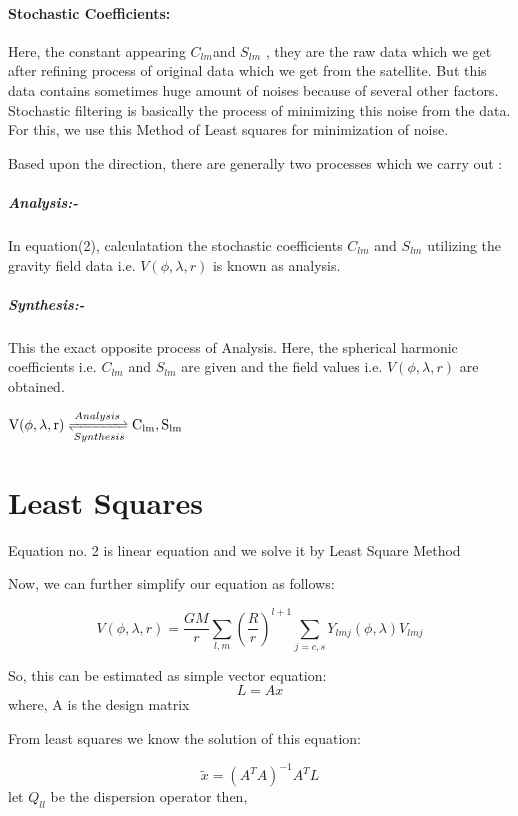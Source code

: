 \documentclass[a4paper,12pt]{article}
\begin{document}
\paragraph{Stochastic Coefficients:} 
Here, the constant appearing $C_{lm}$and $S_{lm}$ , they are the raw data which we get after refining process of original data which we get from the satellite. But this data contains sometimes huge amount of noises because of several other factors. Stochastic filtering is basically the process of minimizing this noise from the data. For this, we use this Method of Least squares for minimization of noise.

Based upon the direction, there are generally two processes which we carry out :

\subparagraph{Analysis:- }  In equation(2), calculatation the stochastic coefficients $C_{lm} $ and $S_{lm}$ utilizing the gravity field data i.e. $V(\phi,\lambda,r)$ is known as analysis.
 \subparagraph{Synthesis:- } This the exact opposite process of Analysis. Here, the spherical harmonic coefficients i.e.  $C_{lm} $ and $S_{lm}$ are given and the field values i.e. $V(\phi,\lambda,r)$ are obtained. \\

\centerline{
$\mathrm{V(\phi,\lambda,r)} \xrightleftharpoons[Synthesis]{Analysis} \mathrm{C_{lm}, S_{lm}}$
}

\section{Least Squares}
Equation no. 2 is linear equation and we solve it by Least Square Method

Now, we can further simplify our equation as follows:

\begin{equation}
V(\phi,\lambda,r)=\frac{GM}{r}\sum_{l,m}^{} \left(\frac{R}{r}\right)^{l+1}\sum_{j=c,s}^{}  Y_{lmj} (\phi,\lambda) V_{lmj}
\end{equation}

So, this can be estimated as simple vector equation:
\begin{equation}
  L= Ax  
\end{equation}
where, A is the design matrix

From least squares we know the solution of this equation:

\begin{equation}
\tilde{x} =(A^T A)^{-1} A^T L
\end{equation}
let $ Q_{ll}$ be the dispersion operator
then,
\end{document}
